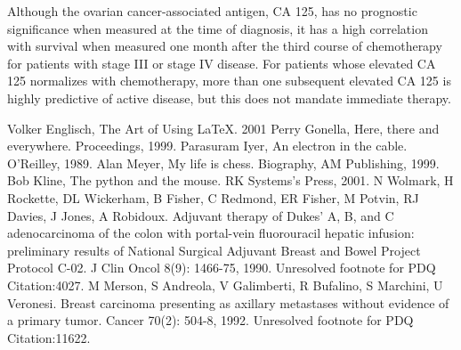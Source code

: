 \documentclass[12pt]{article}
\newcounter{qC}
\begin{document}
\begin{cbunit}
\setcounter{qC}{0}
Although the ovarian cancer-associated antigen, CA 125, has no prognostic
significance when measured at the time of diagnosis, it has a high correlation
with survival when measured one month after the third course of chemotherapy
for patients with stage III or stage IV disease.
\cite{7}
For patients whose
elevated CA 125 normalizes with chemotherapy, more than one subsequent elevated
CA 125 is highly predictive of active disease, but this does not mandate
immediate therapy.
\cite{8, 9}

% 
\begin{thebibliography}{100}
 Volker Englisch, The Art of Using \LaTeX . 2001
 Perry Gonella, Here, there and everywhere.  Proceedings, 1999.
 Parasuram Iyer, An electron in the cable.  O'Reilley, 1989.
 Alan Meyer, My life is chess.  Biography, AM Publishing, 1999.
 Bob Kline, The python and the mouse.  RK Systems's Press, 2001.
N Wolmark, H Rockette, DL Wickerham, B Fisher, C Redmond, ER Fisher, 
M Potvin, RJ Davies, J Jones, A Robidoux.  Adjuvant therapy of Dukes' A, B, 
and C adenocarcinoma of the colon with portal-vein fluorouracil hepatic 
infusion: preliminary results of National Surgical Adjuvant Breast and Bowel 
Project Protocol C-02. J Clin Oncol 8(9): 1466-75, 1990.
Unresolved footnote for PDQ Citation:4027.
M Merson, S Andreola, V Galimberti, R Bufalino, S Marchini, 
U Veronesi.  Breast carcinoma presenting as axillary metastases without 
evidence of a primary tumor. Cancer 70(2): 504-8, 1992.
Unresolved footnote for PDQ Citation:11622.
\end{thebibliography}

\end{cbunit}
\end{document}
